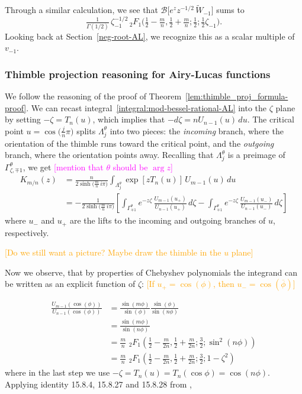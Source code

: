 \documentclass{article}
\newcommand{\borel}{\mathcal{B}}
\theoremstyle{definition}
\theoremstyle{plain}
\begin{document}
Through a similar calculation, we see that $\borel\big[ e^z z^{-1/2}\,\tilde{W}_{-1} \big]$ sums to
\[ \tfrac{1}{\Gamma(1/2)}\,\zeta_{-1}^{-1/2}\,{}_2F_1\big(\tfrac{1}{2}-\tfrac{m}{n}, \tfrac{1}{2}+\tfrac{m}{n}; \tfrac{1}{2}; \tfrac{1}{2}\zeta_{-1}\big). \]
Looking back at Section~\ref{neg-root-AL}, we recognize this as a scalar multiple of $v_{-1}$.



\subsubsection{Thimble projection reasoning for Airy-Lucas functions}\label{contour-argument-AL}
We follow the reasoning of the proof of Theorem~\ref{lem:thimble_proj_formula-proof}. We can recast integral~\eqref{integral:mod-bessel-rational-AL} into the $\zeta$ plane by setting $-\zeta = T_n(u)$, which implies that $-d\zeta = n U_{n-1}(u)\,du$. The critical point $u = \cos\big(\tfrac{j}{n}\pi\big)$ splits $\Lambda^\theta_j$ into two pieces: the {\em incoming} branch, where the orientation of the thimble runs toward the critical point, and the {\em outgoing} branch, where the orientation points away. Recalling that $\Lambda^\theta_j$ is a preimage of $\Gamma^\theta_{\zeta, \mp 1}$, we get \textcolor{magenta}{[mention that $\theta$ should be $\arg z$]}
\begin{align*}%
K_{m/n}(z) & = \frac{n}{2 \sinh\big(\tfrac{m}{n}\,i\pi\big)} \int_{\Lambda^\theta_j} \exp\left[z T_n(u)\right]\,U_{m-1}(u)\,du \\
& = -\frac{1}{2\sinh\big(\tfrac{m}{n}\,i\pi\big)} \left[ \int_{\Gamma^\theta_{\mp 1}} e^{-z\zeta}\,\frac{U_{m-1}(u_+)}{U_{n-1}(u_+)}\,d\zeta - \int_{\Gamma^\theta_{\mp 1}} e^{-z\zeta}\,\frac{U_{m-1}(u_-)}{U_{n-1}(u_-)}\,d\zeta \right]
\end{align*}
where $u_-$ and $u_+$ are the lifts to the incoming and outgoing branches of $u$, respectively.
\begin{center}
\textcolor{orange}{[Do we still want a picture? Maybe draw the thimble in the $u$ plane]}
\end{center}

\color{MediumSpringGreen}
Now we observe, that by properties of Chebyshev polynomials the integrand can be written as an explicit function of $\zeta$: \textcolor{orange}{[If $u_+ = \cos(\phi)$, then $u_- = \cos(\overline{\phi})$]}

\begin{align*}
    \frac{U_{m-1}(\cos(\phi))}{U_{n-1}(\cos(\phi))}&=\frac{\sin(m\phi)}{\sin(\phi)}\frac{\sin(\phi)}{\sin(n \phi)}\\
    &=\frac{\sin(m\phi)}{\sin(n \phi)}\\
    &=\frac{m}{n}\,\, {}_2F_1\left(\frac{1}{2}-\frac{m}{2n},\frac{1}{2}+\frac{m}{2n};\frac{3}{2};\sin^2(n \phi)\right)\\
    &=\frac{m}{n}\,\, {}_2F_1\left(\frac{1}{2}-\frac{m}{2n},\frac{1}{2}+\frac{m}{2n};\frac{3}{2};1-\zeta^2\right) 
\end{align*}
where in the last step we use $-\zeta=T_n(u)=T_n(\cos\phi)=\cos(n\phi)$. Applying identity 15.8.4, 15.8.27 and 15.8.28 from \cite{dlmf}, 
\end{document}
